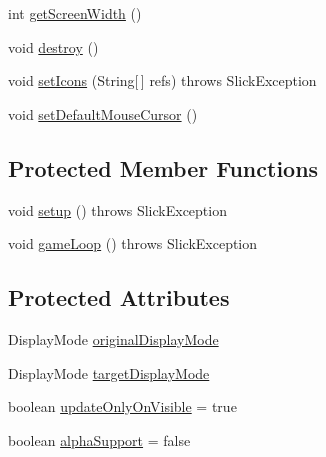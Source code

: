 \begin{DoxyCompactItemize}
\item 
int \mbox{\hyperlink{classorg_1_1newdawn_1_1slick_1_1_app_game_container_a48293caa27148b1a4dc0b77a047f89f3}{get\+Screen\+Width}} ()
\item 
void \mbox{\hyperlink{classorg_1_1newdawn_1_1slick_1_1_app_game_container_a971f338748f899ab0034ba22e491fd60}{destroy}} ()
\item 
void \mbox{\hyperlink{classorg_1_1newdawn_1_1slick_1_1_app_game_container_a1bb9f7e3e418dc296c420f826302f070}{set\+Icons}} (String\mbox{[}$\,$\mbox{]} refs)  throws Slick\+Exception 
\item 
void \mbox{\hyperlink{classorg_1_1newdawn_1_1slick_1_1_app_game_container_acfe3089f87d1952e61f3d2f1572ee5ee}{set\+Default\+Mouse\+Cursor}} ()
\end{DoxyCompactItemize}
\subsection*{Protected Member Functions}
\begin{DoxyCompactItemize}
\item 
void \mbox{\hyperlink{classorg_1_1newdawn_1_1slick_1_1_app_game_container_ac2c97110363892113b435cc8aa5b0d4a}{setup}} ()  throws Slick\+Exception 
\item 
void \mbox{\hyperlink{classorg_1_1newdawn_1_1slick_1_1_app_game_container_a57672732cfac93096300c549103619dd}{game\+Loop}} ()  throws Slick\+Exception 
\end{DoxyCompactItemize}
\subsection*{Protected Attributes}
\begin{DoxyCompactItemize}
\item 
Display\+Mode \mbox{\hyperlink{classorg_1_1newdawn_1_1slick_1_1_app_game_container_a3c00ffa43a8e972598efe7bf27a577ba}{original\+Display\+Mode}}
\item 
Display\+Mode \mbox{\hyperlink{classorg_1_1newdawn_1_1slick_1_1_app_game_container_a10948afa0a5f2911fda0e66a6bfd4a70}{target\+Display\+Mode}}
\item 
boolean \mbox{\hyperlink{classorg_1_1newdawn_1_1slick_1_1_app_game_container_a8ed58465ae60f67d13fa69ea7929d3ef}{update\+Only\+On\+Visible}} = true
\item 
boolean \mbox{\hyperlink{classorg_1_1newdawn_1_1slick_1_1_app_game_container_a303ad9792836be5d1fdb1d0ef60da05c}{alpha\+Support}} = false
\end{DoxyCompactItemize}
